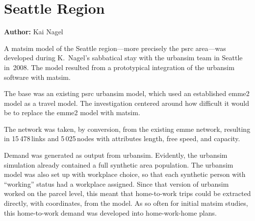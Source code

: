 \chapter{Seattle Region}
\label{ch:seattle}
\hfill \textbf{Author:} Kai Nagel



A \gls{matsim} model of the Seattle region---more precisely the \gls{psrc} area---was developed during K.\ Nagel's sabbatical stay with the \gls{urbansim} team in Seattle in~2008. The model resulted from a prototypical integration of the \gls{urbansim} software \citep[e.g.,][]{WaddellEtc2003UrbanSim} with \gls{matsim}. 

The base was an existing \gls{psrc} \gls{urbansim} model, which used an established \gls{emme2} model 
as a travel model. The investigation centered around how difficult it would be to replace the \gls{emme2} model with \gls{matsim}. 

The network was taken, by conversion, from the existing \gls{emme} network, resulting in 15\,478\,links and 5\,025\,nodes with attributes length, free speed, and capacity.

Demand was generated as output from \gls{urbansim}. Evidently, the \gls{urbansim} simulation already contained a full synthetic area population. The \gls{urbansim} model was also set up with workplace choice, so that each synthetic person with ``working'' status had a workplace assigned. Since that version of \gls{urbansim} worked on the parcel level, this meant that home-to-work trips could be extracted directly, with coordinates, from the model. As so often for initial \gls{matsim}  studies, this home-to-work demand was developed into home-work-home plans.

